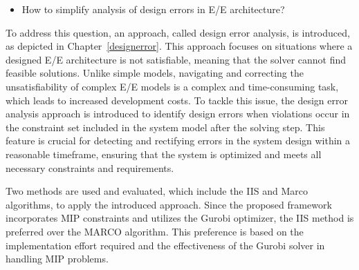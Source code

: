         
        
       \begin{itemize}
        \item How to simplify analysis of design errors in E/E architecture?
       \end{itemize} 
       
        
        To address this question, an approach, called design error analysis, is introduced, as depicted in Chapter~\ref{designerror}. This approach focuses on situations where a designed E/E architecture is not satisfiable, meaning that the solver cannot find feasible solutions. Unlike simple models, navigating and correcting the unsatisfiability of complex E/E models is a complex and time-consuming task, which leads to increased development costs. To tackle this issue, the design error analysis approach is introduced to identify design errors when violations occur in the constraint set included in the system model after the solving step. This feature is crucial for detecting and rectifying errors in the system design within a reasonable timeframe, ensuring that the system is optimized and meets all necessary constraints and requirements.
        
        
        
        Two methods are used and evaluated, which include the IIS and Marco algorithms, to apply the introduced approach. Since the proposed framework incorporates MIP constraints and utilizes the Gurobi optimizer, the IIS method is preferred over the MARCO algorithm. This preference is based on the implementation effort required and the effectiveness of the Gurobi solver in handling MIP problems.

